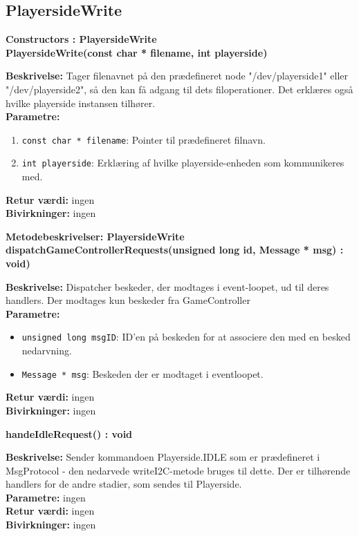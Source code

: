 \documentclass[Softwaredesign/Softwaredesign_main.tex]{subfiles}
\begin{document}
\subsection{PlayersideWrite}
{\large\textbf{Constructors : PlayersideWrite}}\\[0.2cm]
\textbf{PlayersideWrite(const char * filename, int playerside)}
\begin{adjustwidth}{1cm}{0pt}
\textbf{Beskrivelse:} Tager filenavnet på den prædefineret node "/dev/playerside1" eller "/dev/playerside2", så den kan få adgang til dets filoperationer. Det erklæres også hvilke playerside instansen tilhører. \\[0.2cm]
\textbf{Parametre:}
\begin{enumerate}
    \item \lstinline{const char * filename}: Pointer til prædefineret filnavn. 
    \item \lstinline{int playerside}: Erklæring af hvilke playerside-enheden som kommunikeres med. 
\end{enumerate}
\textbf{Retur værdi:} ingen \\[0.2cm]
\textbf{Bivirkninger:} ingen \\[0.2cm]
\end{adjustwidth}

{\large\textbf{Metodebeskrivelser: PlayersideWrite}}\\[0.2cm]
\textbf{dispatchGameControllerRequests(unsigned long id, Message * msg) : void)}
\begin{adjustwidth}{1cm}{0pt}
\textbf{Beskrivelse:} Dispatcher beskeder, der modtages i event-loopet, ud til deres handlers. Der modtages kun beskeder fra GameController\\[0.2cm]
\textbf{Parametre:}
\begin{itemize}
    \item \lstinline{unsigned long msgID}: ID'en på beskeden for at associere den med en besked nedarvning.
    \item \lstinline{Message * msg}: Beskeden der er modtaget i eventloopet.
\end{itemize}
\textbf{Retur værdi:} ingen \\[0.2cm]
\textbf{Bivirkninger:} ingen \\[0.2cm]
\end{adjustwidth}

\textbf{handeIdleRequest() : void}
\begin{adjustwidth}{1cm}{0pt}
\textbf{Beskrivelse:} Sender kommandoen Playerside.IDLE som er prædefineret i MsgProtocol - den nedarvede writeI2C-metode bruges til dette. Der er tilhørende handlers for de andre stadier, som sendes til Playerside.\\[0.2cm]
\textbf{Parametre:} ingen \\[0.2cm]
\textbf{Retur værdi:} ingen \\[0.2cm]
\textbf{Bivirkninger:} ingen \\[0.2cm]
\end{adjustwidth}
\end{document}
